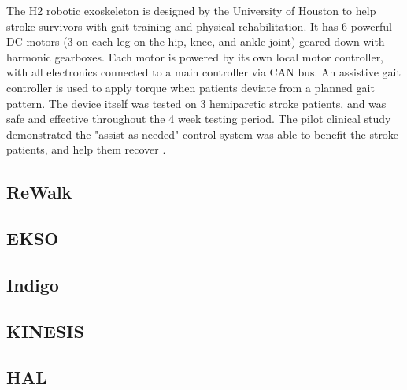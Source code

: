 The H2 robotic exoskeleton is designed by the University of Houston to help stroke survivors with gait training and physical rehabilitation. It has 6 powerful DC motors (3 on each leg on the hip, knee, and ankle joint) geared down with harmonic gearboxes. Each motor is powered by its own local motor controller, with all electronics connected to a main controller via CAN bus. An assistive gait controller is used to apply torque when patients deviate from a planned gait pattern. The device itself was tested on 3 hemiparetic stroke patients, and was safe and effective throughout the 4 week testing period. The pilot clinical study demonstrated the "assist-as-needed" control system was able to benefit the stroke patients, and help them recover \cite{ExoH2}.


\subsection{ReWalk}

\subsection{EKSO}

\subsection{Indigo}

\subsection{KINESIS}

\subsection{HAL}